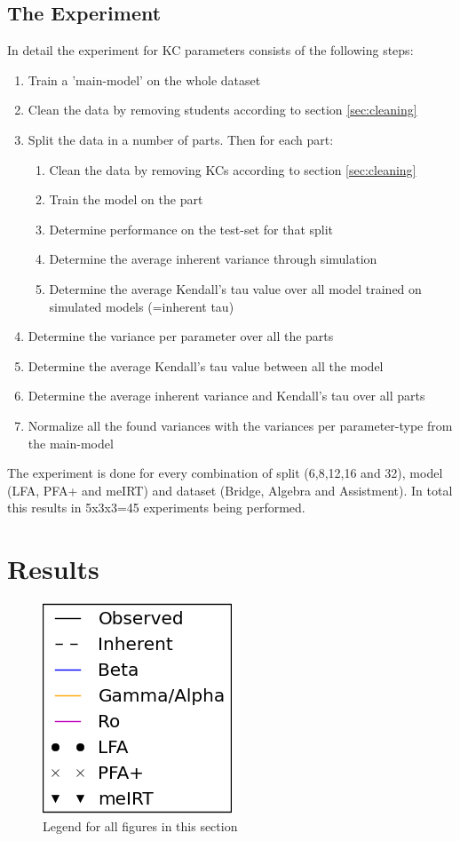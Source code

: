 \documentclass{scrartcl}
\begin{document}
\subsection{The Experiment}
In detail the experiment for KC parameters consists of the following steps:
\begin{enumerate}
\item Train a 'main-model' on the whole dataset
\item Clean the data by removing students according to section \ref{sec:cleaning}
\item Split the data in a number of parts. Then for each part:
\begin{enumerate}
\item Clean the data by removing KCs according to section \ref{sec:cleaning}
\item Train the model on the part
\item Determine performance on the test-set for that split
\item Determine the average inherent variance through simulation
\item Determine the average Kendall's tau value over all model trained on simulated models (=inherent tau)
\end{enumerate}
\item Determine the variance per parameter over all the parts
\item Determine the average Kendall's tau value between all the model
\item Determine the average inherent variance and Kendall's tau over all parts 
\item Normalize all the found variances with the variances per parameter-type from the main-model
\end{enumerate}

The experiment is done for every combination of split (6,8,12,16 and 32), model (LFA, PFA+ and meIRT) and dataset (Bridge, Algebra and Assistment). In total this results in 5x3x3=45 experiments being performed.


\section{Results}

 
\begin{figure}
\begin{center}
\includegraphics[width=.24\textwidth]{images/legend.png}
\end{center}
\caption{Legend for all figures in this section}
\label{fig:legend}
\end{figure}
\end{document}
